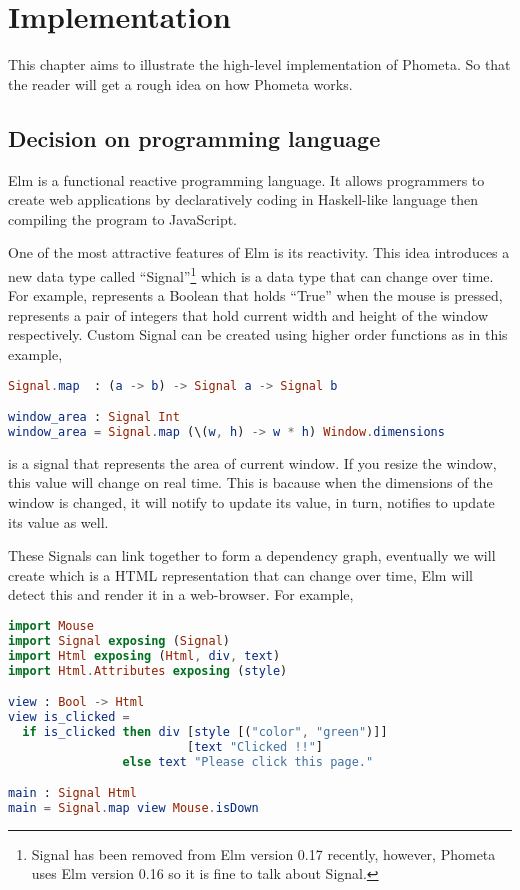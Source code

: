 \documentclass[master.tex]{subfiles}
\begin{document}
\chapter{Implementation}
\label{chap:implementation}

This chapter aims to illustrate the high-level implementation of Phometa. So
that the reader will get a rough idea on how Phometa works.

\section{Decision on programming language}
Elm\supercite{elm-official-website} is a functional reactive programming
language. It allows programmers to create web applications by declaratively
coding in Haskell-like language then compiling the program to JavaScript.

One of the most attractive features of Elm is its reactivity. This idea
introduces a new data type called ``Signal''\footnote{Signal has been removed
  from Elm version 0.17 recently, however, Phometa uses Elm version 0.16 so it
  is fine to talk about Signal.} which is a data type that can change over time.
For example,  represents a Boolean that holds
``True'' when the mouse is pressed,  represents a pair of integers that hold current width and height of the
window respectively. Custom Signal can be created using higher order functions
as in this example,
\begin{lstlisting}[language=elm]
Signal.map  : (a -> b) -> Signal a -> Signal b

window_area : Signal Int
window_area = Signal.map (\(w, h) -> w * h) Window.dimensions
\end{lstlisting}
 is a signal that represents the area of current window. If
you resize the window, this value will change on real time. This is bacause when
the dimensions of the window is changed, it will notify
 to update its value,  in
turn, notifies  to update its value as well.

These Signals can link together to form a dependency graph, eventually we will
create  which is a HTML representation that can change
over time, Elm will detect this  and render it in a web-browser. For
example,

\begin{lstlisting}[language=elm]
import Mouse
import Signal exposing (Signal)
import Html exposing (Html, div, text)
import Html.Attributes exposing (style)

view : Bool -> Html
view is_clicked =
  if is_clicked then div [style [("color", "green")]]
                         [text "Clicked !!"]
                else text "Please click this page."

main : Signal Html
main = Signal.map view Mouse.isDown
\end{lstlisting}
\end{document}

